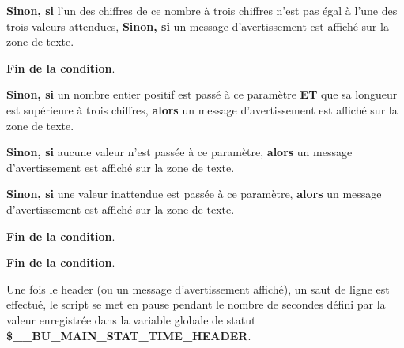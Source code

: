 \documentclass[a4paper,10pt]{article}
\begin{document}
\begin{itemize}
{\begin{itemize}
{                \begin{justify}
                    \textbf{\color{brick}Sinon, si} l'un des chiffres de ce nombre à trois chiffres n'est pas égal à l'une des trois valeurs attendues, \textbf{\color{brick}Sinon, si} un message d'avertissement est affiché sur la zone de texte.
                \end{justify}\setlength{\parskip}{1em}

                \begin{justify}
                    \textbf{\color{brick}Fin de la condition}.
                \end{justify}
            }
        \end{itemize}

        \item
        {
            \begin{justify}
                \textbf{\color{brick}Sinon, si} un nombre entier positif est passé à ce paramètre \textbf{ET} que sa longueur est supérieure à trois chiffres, \textbf{\color{brick}alors} un message d'avertissement est affiché sur la zone de texte.
            \end{justify}\setlength{\parskip}{1em}

            \begin{justify}
                \textbf{\color{brick}Sinon, si} aucune valeur n'est passée à ce paramètre, \textbf{\color{brick}alors} un message d'avertissement est affiché sur la zone de texte.
            \end{justify}

            \begin{justify}
                \textbf{\color{brick}Sinon, si} une valeur inattendue est passée à ce paramètre, \textbf{\color{brick}alors} un message d'avertissement est affiché sur la zone de texte.
            \end{justify}
            
            \begin{justify}
                \textbf{\color{brick}Fin de la condition}.
            \end{justify}
        }
    }
\end{itemize}

\begin{justify}
    \textbf{\color{brick}Fin de la condition}.
\end{justify}\setlength{\parskip}{2em}


\begin{justify}
    Une fois le header (ou un message d'avertissement affiché), un saut de ligne est effectué, le script se met en pause pendant le nombre de secondes défini par la valeur enregistrée dans la variable globale de statut \textbf{\color{orange}\$\_\_BU\_MAIN\_STAT\_TIME\_HEADER}.
\end{justify}\setlength{\parskip}{1em}
\end{document}
